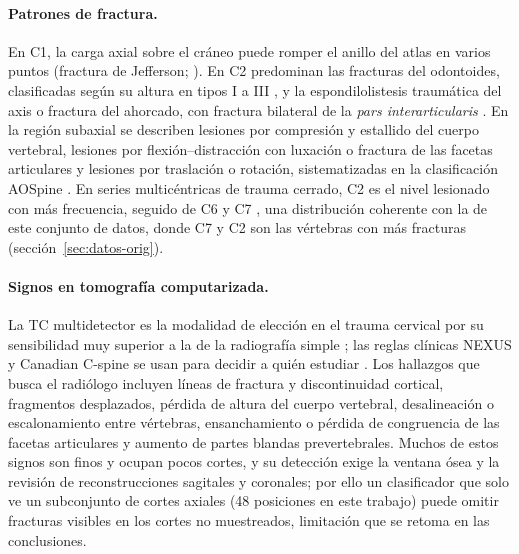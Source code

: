 \paragraph{Patrones de fractura.} En C1, la carga axial sobre el cr\'aneo puede romper el anillo del atlas en varios puntos (fractura de Jefferson; \citealp{jefferson1920atlas}). En C2 predominan las fracturas del odontoides, clasificadas seg\'un su altura en tipos I a III \citep{anderson1974odontoid}, y la espondilolistesis traum\'atica del axis o fractura del ahorcado, con fractura bilateral de la \emph{pars interarticularis} \citep{levine1985hangman}. En la regi\'on subaxial se describen lesiones por compresi\'on y estallido del cuerpo vertebral, lesiones por flexi\'on--distracci\'on con luxaci\'on o fractura de las facetas articulares y lesiones por traslaci\'on o rotaci\'on, sistematizadas en la clasificaci\'on AOSpine \citep{vaccaro2016aospine}. En series multic\'entricas de trauma cerrado, C2 es el nivel lesionado con m\'as frecuencia, seguido de C6 y C7 \citep{goldberg2001distribution}, una distribuci\'on coherente con la de este conjunto de datos, donde C7 y C2 son las v\'ertebras con m\'as fracturas (secci\'on~\ref{sec:datos-orig}).

\paragraph{Signos en tomograf\'ia computarizada.} La TC multidetector es la modalidad de elecci\'on en el trauma cervical por su sensibilidad muy superior a la de la radiograf\'ia simple \citep{holmes2005ct}; las reglas cl\'inicas NEXUS y Canadian C-spine se usan para decidir a qui\'en estudiar \citep{hoffman2000nexus,stiell2001ccr}. Los hallazgos que busca el radi\'ologo incluyen l\'ineas de fractura y discontinuidad cortical, fragmentos desplazados, p\'erdida de altura del cuerpo vertebral, desalineaci\'on o escalonamiento entre v\'ertebras, ensanchamiento o p\'erdida de congruencia de las facetas articulares y aumento de partes blandas prevertebrales. Muchos de estos signos son finos y ocupan pocos cortes, y su detecci\'on exige la ventana \'osea y la revisi\'on de reconstrucciones sagitales y coronales; por ello un clasificador que solo ve un subconjunto de cortes axiales (48 posiciones en este trabajo) puede omitir fracturas visibles en los cortes no muestreados, limitaci\'on que se retoma en las conclusiones.

